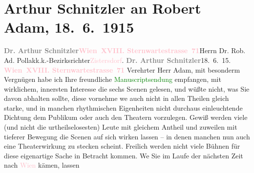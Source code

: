 

               \section[Arthur Schnitzler an Robert Adam, 18. 6. 1915]{ Arthur Schnitzler an Robert Adam, 18. 6. 1915}\nopagebreak{}\rehead{ }\normalsize\beginnumbering{} \toendnotes[C]{\smallbreak\pagebreak[2]} 
\toendnotes[C]{\smallbreak}\pstart{}{\pb}\textcolor{gray}{\textbf{Dr. Arthur Schnitzler}}\pend{}\pstart{}\textcolor{gray}{\textbf{\textcolor{pink}{Wien XVIII. Sternwartestrasse 71}{}\ledrightnote{\textcolor{pink}{Sternwartestraße}}}}\pend{}{\bigskip}\pstart{}{\pb}Herrn Dr. Rob. Ad. Pollak\pend{}\pstart{}k.k.-Bezirksrichter\pend{}\pstart{}\textcolor{pink}{Zistersdorf}{}\ledrightnote{\textcolor{pink}{Zistersdorf}}.\pend{}{\bigskip}\pstart
           \noindent{}{\pb}\textcolor{gray}{\textbf{Dr. Arthur Schnitzler}}\hfill 18. 6. 15.\pend
           \pstart
           \textcolor{gray}{\textbf{\textcolor{pink}{Wien XVIII. Sternwartestrasse 71}{}\ledrightnote{\textcolor{pink}{Sternwartestraße}}}}\pend
           \pstart{}Verehrter Herr Adam,\pend\pstart
           mit besonderm Vergnügen habe ich Ihre freundliche \textcolor{green}{Manuscriptsendung}{} empfangen, mit wirklichem,
                    innersten Interesse die sechs Scenen gelesen, und wüßte nicht, was Sie davon
                    abhalten sollte, diese vornehme we{\geminationn} auch nicht in
                    allen Theilen gleich starke, und in manchen rhythmischen Eigenheiten nicht
                    durchaus einleuchtende Dichtung dem Publikum oder auch den Theatern vorzulegen.
                    Gewiß werden viele (und nicht die urtheilselosesten) {\pb}\introOben{}Leute\introOben{} mit gleichem Antheil und zuweilen mit tieferer
                    Bewegung die Scenen auf sich wirken lassen – in denen manchen nun auch eine
                    Theaterwirkung zu stecken scheint. Freilich werden nicht viele Bühnen für diese
                    eigenartige Sache in Betracht kommen. We{\geminationn} Sie im
                    Laufe der nächsten Zeit nach \textcolor{pink}{Wien}{}\ledrightnote{\textcolor{pink}{Wien}} kämen, lassen
